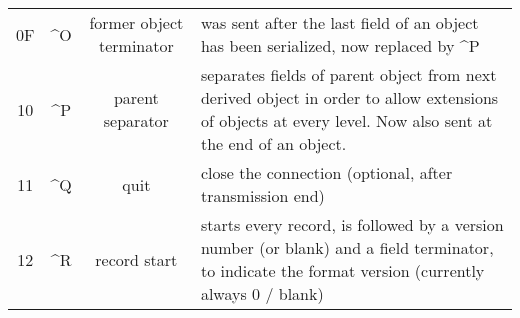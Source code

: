 \documentclass[11pt,a4paper,oneside]{article}
\begin{document}
\begin{tabular}{|c|c|c|p{8cm}|}
0F & \textasciicircum O &
former object terminator & was sent after the last field of an object has been serialized, now replaced by \textasciicircum P \\
10 & \textasciicircum P & parent separator   & separates fields of parent object
from next derived object in order to allow extensions of objects at every level. Now also sent at the end of an object.\\
11 & \textasciicircum Q & quit      & close the connection (optional, after
transmission end)
\\
12 & \textasciicircum R & record start       & starts every record, is
followed by a version number (or blank) and a field terminator, to indicate
the format version (currently always 0 / blank) \\
\hline
\end{tabular}
\end{document}
